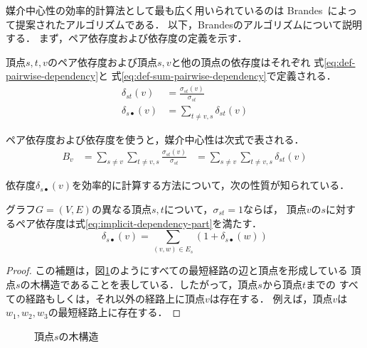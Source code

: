媒介中心性の効率的計算法として最も広く用いられているのは
Brandes~\cite{Brandes2001}によって提案されたアルゴリズムである．
以下，Brandesのアルゴリズムについて説明する．
まず，ペア依存度および依存度の定義を示す．

\begin{definition}
  \label{def:pairwise-dependency}
  頂点$s,t,v$のペア依存度および頂点$s,v$と他の頂点の依存度はそれぞれ
  式\eqref{eq:def-pairwise-dependency}と
  式\eqref{eq:def-sum-pairwise-dependency}で定義される．
    \begin{align}
      \delta_{st}(v)&=\frac{\sigma_{st}(v)}{\sigma_{st}}
      \label{eq:def-pairwise-dependency} \\
      \delta_{s\bullet}(v)&=\sum_{t\neq v,s}\delta_{st}(v)
      \label{eq:def-sum-pairwise-dependency}
    \end{align}
\end{definition}

ペア依存度および依存度を使うと，媒介中心性は次式で表される．
\begin{equation*}
  \begin{aligned}
    B_v&=\sum_{s\neq v}\sum_{t\neq v,s}\frac{\sigma_{st}(v)}{\sigma_{st}}
    &=\sum_{s\neq v}\sum_{t\neq v,s}\delta_{st}(v)
  \end{aligned}
\end{equation*}

依存度$\delta_{s\bullet}(v)$を効率的に計算する方法について，次の性質が知られている．

\begin{lemma}
  \label{lemma:implicit-dependency-part}
  グラフ$G=(V,E)$の異なる頂点$s,t$について，$\sigma_{st}=1$ならば，
  頂点$v$の$s$に対するペア依存度は式\eqref{eq:implicit-dependency-part}を満たす．
  \begin{equation}
    \label{eq:implicit-dependency-part}
    \delta_{s\bullet}(v)=\sum_{(v,w)\in E_s}(1+\delta_{s\bullet}(w))
  \end{equation}
\end{lemma}
\begin{proof}
  この補題は，図\ref{fig:implicit-dependency-1}のようにすべての最短経路の辺と頂点を形成している
  頂点$s$の木構造であることを表している．したがって，頂点$s$から頂点$t$までの
  すべての経路もしくは，それ以外の経路上に頂点$v$は存在する．
  例えば，頂点$v$は$w_1,w_2,w_3$の最短経路上に存在する．
\end{proof}

\begin{figure}[tb]
  \centering
  \def\svgwidth{.35\linewidth}
  
  \caption{頂点$s$の木構造}
  \label{fig:implicit-dependency-1}
\end{figure}

